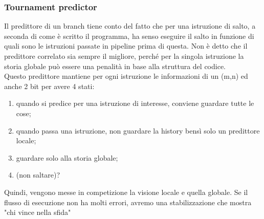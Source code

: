 \documentclass[14pt, oneside]{book}
\begin{document}
\subsubsection{Tournament predictor}
Il predittore di un branch tiene conto del fatto che per una istruzione di salto, a seconda di come è scritto il programma, ha senso eseguire il salto in funzione di quali sono le istruzioni passate in pipeline prima di questa. Non è detto che il predittore correlato sia sempre il migliore, perché per la singola istruzione la storia globale può essere una penalità in base alla struttura del codice.\\ Questo predittore mantiene per ogni istruzione le informazioni di un (m,n) ed anche 2 bit per avere 4 stati:
\begin{enumerate}
\item quando si predice per una istruzione di interesse, conviene guardare tutte le cose;
\item quando passa una istruzione, non guardare la history bensì solo un predittore locale;
\item guardare solo alla storia globale;
\item (non saltare)?
\end{enumerate}
Quindi, vengono messe in competizione la visione locale e quella globale. Se il flusso di esecuzione non ha molti errori, avremo una stabilizzazione che mostra "chi vince nella sfida"
\end{document}
